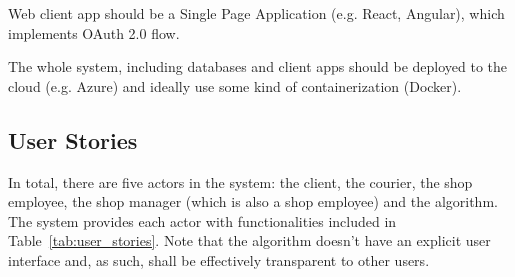 \documentclass[../main.tex]{subfiles}
\begin{document}
Web client app should be a Single Page Application (e.g. React, Angular), which implements OAuth 2.0 flow.

The whole system, including databases and client apps should be deployed to the cloud (e.g. Azure) and ideally use some kind of containerization (Docker).

\subsection{User Stories}

In total, there are five actors in the system: the client, the courier, the shop employee, the shop manager (which is also a shop employee) and the algorithm. The system provides each actor with functionalities included in Table~\ref{tab:user_stories}. Note that the algorithm doesn't have an explicit user interface and, as such, shall be effectively transparent to other users. 
\end{document}
